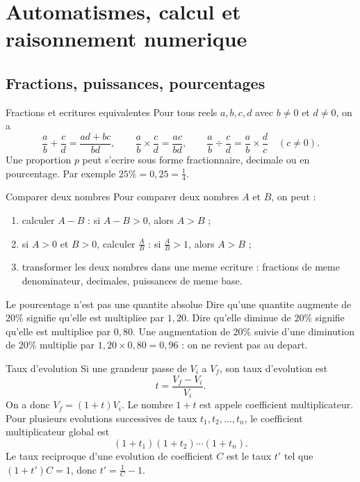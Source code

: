 \documentclass[11pt,a4paper]{article}
\begin{document}
\section{Automatismes, calcul et raisonnement numerique}

\subsection{Fractions, puissances, pourcentages}
\begin{boitecours}{Fractions et ecritures equivalentes}
Pour tous reels $a,b,c,d$ avec $b\ne0$ et $d\ne0$, on a
\[
\frac{a}{b}+\frac{c}{d}=\frac{ad+bc}{bd},\qquad
\frac{a}{b}\times\frac{c}{d}=\frac{ac}{bd},\qquad
\frac{a}{b}\div\frac{c}{d}=\frac{a}{b}\times\frac{d}{c}\quad(c\ne0).
\]
Une proportion $p$ peut s'ecrire sous forme fractionnaire, decimale ou en pourcentage. Par exemple $25\%=0,25=\frac14$.
\end{boitecours}

\begin{boitemethode}{Comparer deux nombres}
Pour comparer deux nombres $A$ et $B$, on peut :
\begin{enumerate}
  \item calculer $A-B$ : si $A-B>0$, alors $A>B$ ;
  \item si $A>0$ et $B>0$, calculer $\frac AB$ : si $\frac AB>1$, alors $A>B$ ;
  \item transformer les deux nombres dans une meme ecriture : fractions de meme denominateur, decimales, puissances de meme base.
\end{enumerate}
\end{boitemethode}

\begin{boiteattention}{Le pourcentage n'est pas une quantite absolue}
Dire qu'une quantite augmente de $20\%$ signifie qu'elle est multipliee par $1,20$. Dire qu'elle diminue de $20\%$ signifie qu'elle est multipliee par $0,80$. Une augmentation de $20\%$ suivie d'une diminution de $20\%$ multiplie par $1,20\times0,80=0,96$ : on ne revient pas au depart.
\end{boiteattention}

\begin{boitecours}{Taux d'evolution}
Si une grandeur passe de $V_i$ a $V_f$, son taux d'evolution est
\[
t=\frac{V_f-V_i}{V_i}.
\]
On a donc $V_f=(1+t)V_i$. Le nombre $1+t$ est appele coefficient multiplicateur.
Pour plusieurs evolutions successives de taux $t_1,t_2,\dots,t_n$, le coefficient multiplicateur global est
\[
(1+t_1)(1+t_2)\cdots(1+t_n).
\]
Le taux reciproque d'une evolution de coefficient $C$ est le taux $t'$ tel que $(1+t')C=1$, donc $t'=\frac1C-1$.
\end{boitecours}
\end{document}
